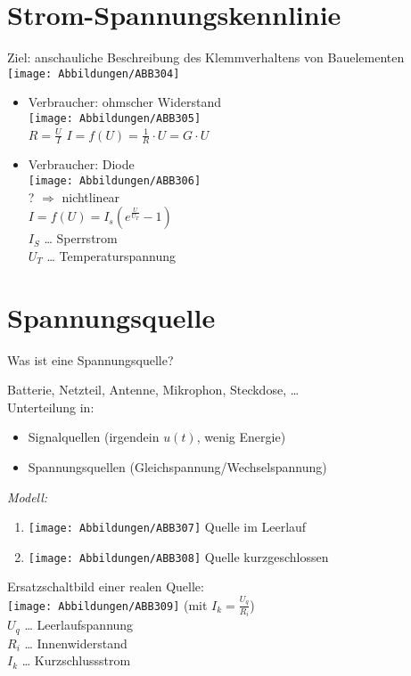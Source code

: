 \documentclass{scrreprt}
\begin{document}
\section{Strom-Spannungskennlinie}
Ziel: anschauliche Beschreibung des Klemmverhaltens von Bauelementen\\
\texttt{[image: Abbildungen/ABB304]}
\begin{itemize}
\item Verbraucher: ohmscher Widerstand\\
\texttt{[image: Abbildungen/ABB305]}\\
$R=\frac{U}{I}$
$I=f(U)=\frac{1}{R}\cdot U = G \cdot U$
\item Verbraucher: Diode\\
\texttt{[image: Abbildungen/ABB306]}\\
? $\Rightarrow$ nichtlinear\\
$I=f(U)=I_s\left(e^{\frac{U}{U_T}}-1\right)$\\
$I_S$ … Sperrstrom\\
$U_T$ … Temperaturspannung 
\end{itemize}

\section{Spannungsquelle}

Was ist eine Spannungsquelle?

Batterie, Netzteil, Antenne, Mikrophon, Steckdose, …\smallskip\\
Unterteilung in:
\begin{itemize}
\item Signalquellen (irgendein $u(t)$, wenig Energie)
\item Spannungsquellen (Gleichspannung/Wechselspannung)
\end{itemize}
\emph{Modell:}
\begin{enumerate}
\item \texttt{[image: Abbildungen/ABB307]} Quelle im Leerlauf
\item \texttt{[image: Abbildungen/ABB308]} Quelle kurzgeschlossen
\end{enumerate}
Ersatzschaltbild einer realen Quelle:\\
\texttt{[image: Abbildungen/ABB309]} (mit $I_k=\frac{U_q}{R_i}$)\\
$U_q$ … Leerlaufspannung\\
$R_i$ … Innenwiderstand\\
$I_k$ … Kurzschlussstrom
\end{document}
